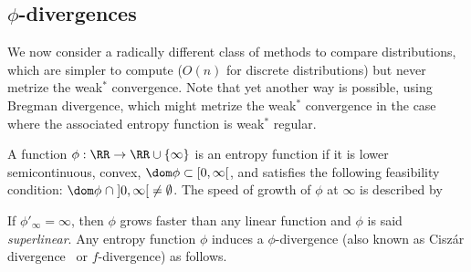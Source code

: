 






\subsection{$\phi$-divergences}
\label{sec-phi-div}

We now consider a radically different class of methods to compare distributions, which are simpler to compute ($O(n)$ for discrete distributions) but never metrize the weak$^*$ convergence. 
%
Note that yet another way is possible, using Bregman divergence, which might metrize the weak$^*$ convergence in the case where the associated entropy function is weak$^*$ regular.

\begin{defn}
\label{def_entropy}
A function $\phi : \RR \to \RR \cup \{\infty\}$ is an entropy function if it is lower semicontinuous, convex, $\dom \phi\subset [0,\infty[$, and satisfies the following feasibility condition:  $\dom \phi \; \cap\;  ]0, \infty[\; \neq \emptyset$. The speed of growth of $\phi$ at $\infty$ is described by %
\end{defn}

If $\phi'_\infty = \infty$, then $\phi$ grows faster than any linear function and $\phi$ is said \emph{superlinear}. Any entropy function $\phi$ induces a $\phi$-divergence (also known as Cisz\'ar divergence~\cite{ciszar1967information,ali1966general} or $f$-divergence) as follows.

